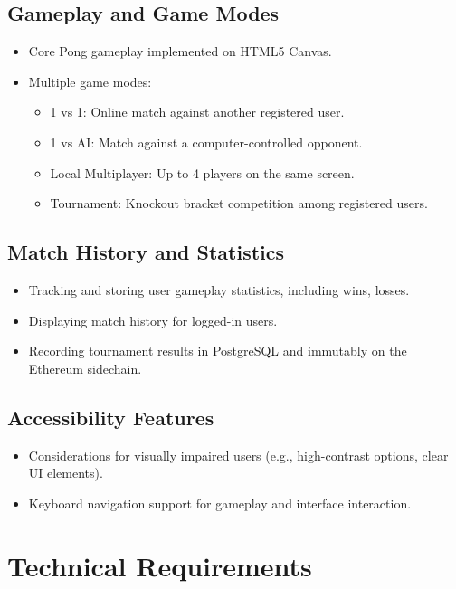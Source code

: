 \subsection*{Gameplay and Game Modes}
\begin{itemize}
    \item Core Pong gameplay implemented on HTML5 Canvas.
    \item Multiple game modes:
        \begin{itemize}
            \item 1 vs 1: Online match against another registered user.
            \item 1 vs AI: Match against a computer-controlled opponent.
            \item Local Multiplayer: Up to 4 players on the same screen.
            \item Tournament: Knockout bracket competition among registered users.
        \end{itemize}
\end{itemize}

\subsection*{Match History and Statistics}
\begin{itemize}
    \item Tracking and storing user gameplay statistics, including wins, losses.
    \item Displaying match history for logged-in users.
    \item Recording tournament results in PostgreSQL and immutably on the Ethereum sidechain.
\end{itemize}

\subsection*{Accessibility Features}
\begin{itemize}
    \item Considerations for visually impaired users (e.g., high-contrast options, clear UI elements).
    \item Keyboard navigation support for gameplay and interface interaction.
\end{itemize}

\section{Technical Requirements}
